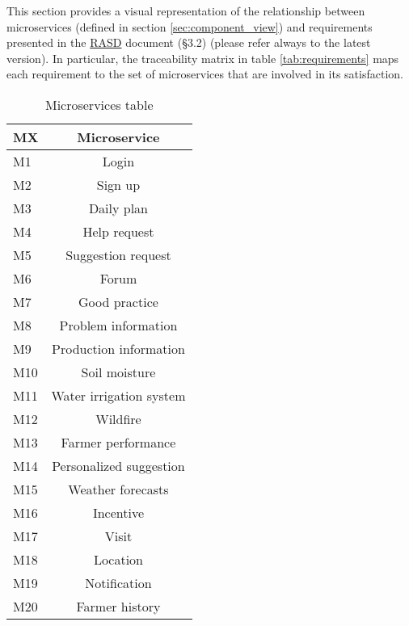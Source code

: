 This section provides a visual representation of the relationship between microservices (defined in section \ref{sec:component_view}) and requirements presented in the \href{https://github.com/MarcoRomanini/GoriRomaniniWatanabe/tree/main/DeliveryFolder}{RASD} document (\S 3.2) (please refer always to the latest version). In particular, the traceability matrix in table \ref{tab:requirements} maps each requirement to the set of microservices that are involved in its satisfaction.

\begin{table}[H]
    \setlength\arrayrulewidth{1pt}
    \centering
    \begin{tabular}{|l|c|}
        \rowcolor{myblue}
        \hline
        \color{white}MX & \color{white}Microservice\\
        \hline
        M1      &   Login\\
        \hline
        M2      &   Sign up\\
        \hline
        M3      &   Daily plan\\
        \hline
        M4      &   Help request\\
        \hline
        M5      &   Suggestion request\\
        \hline
        M6      &   Forum\\
        \hline
        M7      &   Good practice\\
        \hline
        M8      &   Problem information\\
        \hline
        M9      &   Production information\\
        \hline
        M10      &   Soil moisture\\
        \hline
        M11      &   Water irrigation system\\
        \hline
        M12      &   Wildfire\\
        \hline
        M13      &   Farmer performance\\
        \hline
        M14      &   Personalized suggestion\\
        \hline
        M15      &   Weather forecasts\\
        \hline
        M16      &   Incentive\\
        \hline
        M17     & Visit \\
        \hline
        M18     & Location\\
        \hline
        M19     & Notification\\
        \hline
        M20     & Farmer history\\
        \hline
    \end{tabular}
    
    \caption{\label{tab:microservices_table}Microservices table}
    
\end{table}



